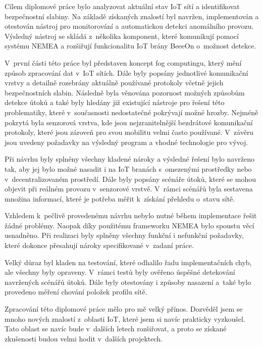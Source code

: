 \documentclass[thesis=M,czech]{FITthesis}[2012/06/26]
\begin{document}
\begin{conclusion}

Cílem diplomové práce bylo analyzovat aktuální stav IoT sítí a identifikovat bezpečnostní 
slabiny. Na základě získaných znalostí byl navržen,
implementován a otestován nástroj
pro monitorování a automatickou detekci anomálního provozu. Výsledný nástroj se skládá z~několika
komponent, které komunikují pomocí systému NEMEA a rozšiřují funkcionalitu IoT brány BeeeOn
o~možnost detekce. 

V~první části této práce byl představen koncept fog computingu, který mění 
způsob zpracování dat v~IoT sítích. Dále byly popsány jednotlivé komunikační vrstvy a detailně rozebrány
aktuálně používané protokoly včetně jejich bezpečnostních slabin. Následně byla věnována 
pozornost možných způsobům detekce útoků a také byly hledány již existující nástroje 
pro řešení této 
problematiky, které v~současnosti nedostatečné pokrývají možné hrozby. Nejméně pokrytá byla 
senzorová vrstva, kde jsou nejzranitelnější bezdrátové komunikační protokoly, které jsou zároveň 
pro svou mobilitu velmi často používané.
V~závěru jsou uvedeny
požadavky na výsledný program a vhodné technologie pro vývoj.

Při návrhu byly splněny všechny kladené nároky a výsledné řešení bylo navrženo tak, aby jej 
bylo možné nasadit i na IoT branách s~omezenými prostředky nebo v~decentralizovaném prostředí. 
Dále byly popsány scénáře útoků, které se mohou objevit při reálném provozu v~senzorové vrstvě.
V~rámci scénářů byla sestavena množina informací, které je potřeba měřit k~získání přehledu
o~stavu sítě. 

Vzhledem k~pečlivě provedenému návrhu nebylo nutné během implementace řešit žádné problémy. Naopak
díky použitému frameworku NEMEA bylo spoustu věcí usnadněno. Při 
realizaci byly splněny všechny funkční i nefunkční požadavky, které dokonce přesahují nároky 
specifikované v~zadaní práce.

Velký důraz byl kladen na testování, které odhalilo řadu implementačních chyb, ale všechny byly
opraveny. V~rámci testů byly ověřeno úspěšné detekování navržených scénářů útoků. Dále byly
otestovány i způsoby nasazení a~také bylo provedeno měření chování položek profilu sítě.

Zpracování této diplomové práce mělo pro mě velký přínos. Dozvěděl jsem se mnoho nových znalostí 
z~oblasti IoT, které jsem si navíc prakticky vyzkoušel. Tato oblast se navíc bude v~dalších
letech rozšiřovat, a proto se získané zkušenosti budou velmi hodit v~dalších projektech.


\end{conclusion}
\end{document}
